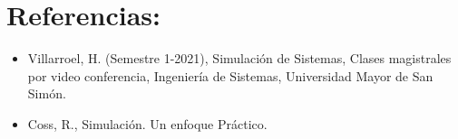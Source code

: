 \documentclass[11pt,letterpaper]{report}
\begin{document}
\begin{center}
\end{center}

\section*{Referencias:}

\begin{itemize}[label=-]
\item Villarroel, H. (Semestre 1-2021), Simulación de Sistemas, Clases magistrales por video conferencia, Ingeniería de Sistemas, Universidad Mayor de San Simón.
\item Coss, R., Simulación. Un enfoque Práctico.
\end{itemize}
\end{document}
